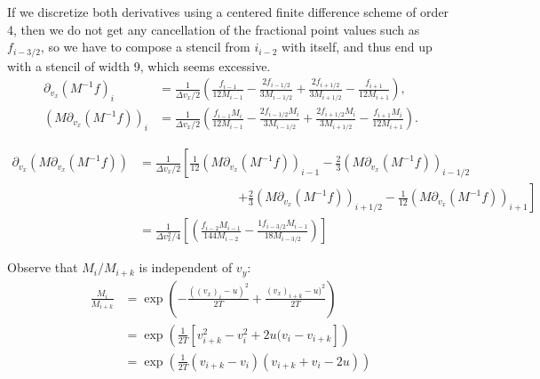 \documentclass{article}
\begin{document}
If we discretize both derivatives using a centered finite difference scheme of order 4, then we do not get any cancellation of the fractional point values such as $f_{i-3/2}$, so
we have to compose a stencil from $i_{i-2}$ with itself, and thus end up with a stencil of width 9, which seems excessive.
\begin{align*}
    \partial_{v_x} (M^{-1} f)_i &= \frac{1}{\Delta v_x / 2} \left( \frac{f_{i-1}}{12 M_{i-1}} - \frac{2f_{i-1/2}}{3 M_{i-1/2}} + \frac{2f_{i+1/2}}{3 M_{i+1/2}} - \frac{f_{i+1}}{12 M_{i+1}} \right), \\
    (M \partial_{v_x} (M^{-1} f))_i &= \frac{1}{\Delta v_x / 2} \left( \frac{f_{i-1} M_i}{12 M_{i-1}} - \frac{2f_{i-1/2} M_i}{3 M_{i-1/2}} + \frac{2f_{i+1/2} M_i}{3 M_{i+1/2}} - \frac{f_{i+1} M_i}{12 M_{i+1}} \right).
\end{align*}

\begin{align*}
    \partial_{v_x} (M \partial_{v_x} (M^{-1} f)) &= \frac{1}{\Delta v_x / 2} \left[ \frac{1}{12} (M \partial_{v_x} (M^{-1} f))_{i-1} - \frac{2}{3} (M \partial_{v_x} (M^{-1} f))_{i-1/2} \right. \\
                                                 &\qquad\qquad\qquad\qquad  \left. +  \frac{2}{3} (M \partial_{v_x} (M^{-1} f))_{i+1/2} - \frac{1}{12} (M \partial_{v_x} (M^{-1} f))_{i+1} \right] \\
                                                 &= \frac{1}{\Delta v_x^2/4} \left[ \left( \frac{f_{i-2} M_{i-1}}{144 M_{i-2}} - \frac{1 f_{i-3/2} M_{i-1}}{18 M_{i-3/2}} \right)  \right] 
\end{align*}

Observe that $M_i / M_{i+k}$ is independent of $v_y$:
\begin{align*}
    \frac{M_i}{M_{i+k}} &= \exp \left( -\frac{((v_x)_i - u)^2}{2T} + \frac{(v_x)_{i+k} - u)^2}{2T} \right) \\
                        &= \exp \left( \frac{1}{2T} \left[ v_{i+k}^2 - v_i^2 + 2u(v_i - v_{i+k} \right]  \right)  \\
                        &= \exp \left( \frac{1}{2T} (v_{i+k} - v_i)(v_{i+k} + v_i - 2u)  \right) 
\end{align*}
\end{document}
